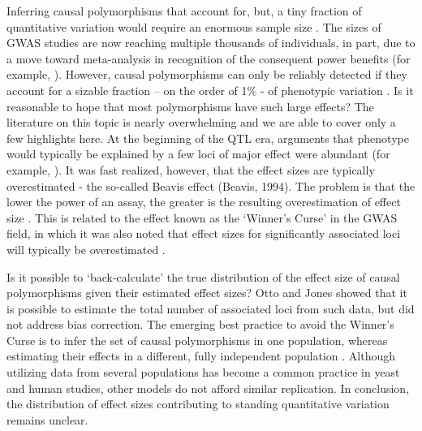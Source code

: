 Inferring causal polymorphisms that account for, but, a tiny fraction of quantitative variation would require an enormous sample size \cite{Long1999}. The sizes of GWAS studies are now reaching multiple thousands of individuals, in part, due to a move toward meta-analysis in recognition of the consequent power benefits (for example, \cite{Lindgren2009,Stahl2010}). However, causal polymorphisms can only be reliably detected if they account for a sizable fraction – on the order of 1\% - of phenotypic variation \cite{Long1999}. Is it reasonable to hope that most polymorphisms have such large effects? The literature on this topic is nearly overwhelming and we are able to cover only a few highlights here. At the beginning of the QTL era, arguments that phenotype would typically be explained by a few loci of major effect were abundant (for example, \cite{Mackay2001}). It was fast realized, however, that the effect sizes are typically overestimated - the so-called Beavis effect (Beavis, 1994). The problem is that the lower the power of an assay, the greater is the resulting overestimation of effect size \cite{Lynch1998}. This is related to the effect known as the `Winner's Curse' in the GWAS field, in which it was also noted that effect sizes for significantly associated loci will typically be overestimated \cite{Kraft2008}.

Is it possible to `back-calculate' the true distribution of the effect size of causal polymorphisms given their estimated effect sizes? Otto and Jones \cite{Otto2000} showed that it is possible to estimate the total number of associated loci from such data, but did not address bias correction. The emerging best practice to avoid the Winner's Curse is to infer the set of causal polymorphisms in one population, whereas estimating their effects in a different, fully independent population \cite{Kruglyak2008}. Although utilizing data from several populations has become a common practice in yeast and human studies, other models do not afford similar replication. In conclusion, the distribution of effect sizes contributing to standing quantitative variation remains unclear.

